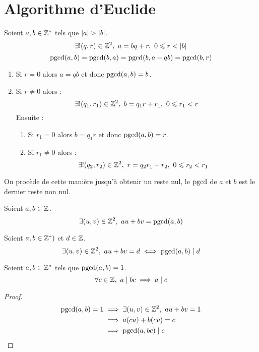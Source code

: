 \section{Algorithme d'Euclide}
\begin{proposition}
	Soient $a, b \in \mathbb{Z}^*$ tels que $\abs{a} > \abs{b}$.
	\[ \exists ! (q, r) \in \mathbb{Z}^2,\ a = bq + r,\ 0 \leqslant r < \abs{b} \]
	\[ \operatorname{pgcd}(a, b) = \operatorname{pgcd}(b, a) = \operatorname{pgcd}(b, a - qb) = \operatorname{pgcd}(b, r) \]
	\begin{enumerate}
		\item Si $r = 0$ alors $a = qb$ et donc $\operatorname{pgcd}(a, b) = b$.
		\item Si $r \neq 0$ alors :
		\[ \exists ! (q_1, r_1) \in \mathbb{Z}^2,\ b = q_1 r + r_1,\ 0 \leqslant r_1 < r \]
		Ensuite : 
		\begin{enumerate}
			\item Si $r_1 = 0$ alors $b = q_1 r$ et donc $\operatorname{pgcd}(a, b) = r$.
			\item Si $r_1 \neq 0$ alors :
			\[ \exists ! (q_2, r_2) \in \mathbb{Z}^2,\ r = q_2 r_1 + r_2,\ 0 \leqslant r_2 < r_1 \]
		\end{enumerate}
	\end{enumerate}
	
	On procède de cette manière jusqu'à obtenir un reste nul, le $\operatorname{pgcd}$ de $a$ et $b$ est le dernier reste non nul.
\end{proposition}

\begin{theorem}
	Soient $a, b \in \mathbb{Z}$.
	\[ \exists (u, v) \in \mathbb{Z}^2,\ au + bv = \operatorname{pgcd}(a, b) \]
\end{theorem}

\begin{corollary}
	Soient $a, b \in \mathbb{Z}^*)$ et $d \in \mathbb{Z}$.
	\[ \exists (u, v) \in \mathbb{Z}^2,\ au + bv = d \iff \operatorname{pgcd}(a,b) \mid d \]
\end{corollary}

\begin{lemma}
	Soient $a, b \in \mathbb{Z}^*$ tels que $\operatorname{pgcd}(a, b) = 1$.
	\[ \forall c \in \mathbb{Z},\ a \mid bc \implies a \mid c \]
\end{lemma}

\begin{proof}
	\begin{align*}
		\operatorname{pgcd}(a, b) = 1 &\implies \exists(u, v) \in \mathbb{Z}^2,\ au + bv = 1 \\
		&\implies a(cu) + b(cv) = c \\ 
		&\implies \operatorname{pgcd}(a, bc) \mid c
	\end{align*}
\end{proof}

